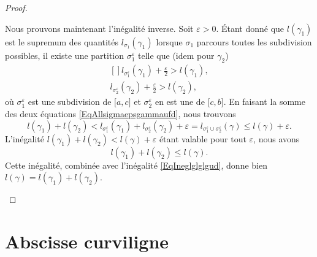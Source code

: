 \begin{proof}
\begin{enumerate}
            Nous prouvons maintenant l'inégalité inverse. Soit $\varepsilon>0$. Étant donné que $l(\gamma_1)$ est le supremum des quantités $l_{\sigma_1}(\gamma_1)$ lorsque $\sigma_1$ parcours toutes les subdivision possibles, il existe une partition $\sigma_1^{\varepsilon}$ telle que (idem pour $\gamma_2$)
            \begin{equation}        \label{EqAllsigmaepsgammaufd}
                \begin{aligned}[]
                    l_{\sigma_1^{\varepsilon}}(\gamma_1)+\frac{ \varepsilon }{2}>l(\gamma_1),\\
                    l_{\sigma_2^{\varepsilon}}(\gamma_2)+\frac{ \varepsilon }{2}>l(\gamma_2),
                \end{aligned}
            \end{equation}
            où $\sigma_1^{\varepsilon}$ est une subdivision de $\mathopen[ a , c \mathclose]$ et $\sigma_2^{\varepsilon}$ en est une de $\mathopen[ c , b \mathclose]$. En faisant la somme des deux équations \eqref{EqAllsigmaepsgammaufd}, nous trouvons
            \begin{equation}
                l(\gamma_1)+l(\gamma_2)<l_{\sigma_1^{\varepsilon}}(\gamma_1)+l_{\sigma_2^{\varepsilon}}(\gamma_2)+\varepsilon=l_{\sigma_1^{\varepsilon}\cup\sigma_2^{\varepsilon}}(\gamma)\leq l(\gamma)+\varepsilon.
            \end{equation}
            L'inégalité $l(\gamma_1)+l(\gamma_2)<l(\gamma)+\varepsilon$ étant valable pour tout $\varepsilon$, nous avons
            \begin{equation}
                l(\gamma_1)+l(\gamma_2)\leq l(\gamma).
            \end{equation}
            Cette inégalité, combinée avec l'inégalité \eqref{EqIneglglglgud}, donne bien $l(\gamma)=l(\gamma_1)+l(\gamma_2)$.
    \end{enumerate}
\end{proof}


\section{Abscisse curviligne}

